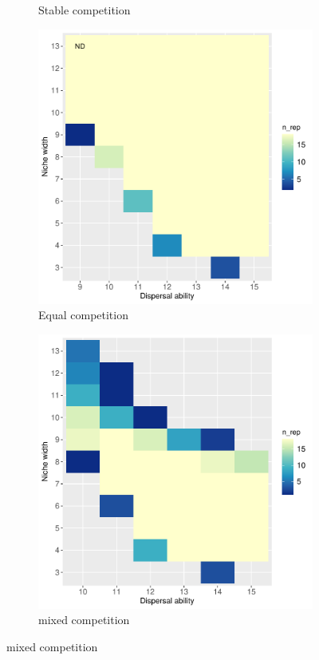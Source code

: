\begin{figure}
\begin{subfigure}[b]{0.45\linewidth}
		\caption{Stable competition}
		\label{fig:para-stable}
	\end{subfigure}
	\begin{subfigure}[b]{0.45\linewidth}
		\includegraphics[width=\linewidth]{./figures/Parameter_space_overlook_equal_competition.pdf}
		\caption{Equal competition}
		\label{fig:para-equal}
	\end{subfigure}
	\begin{subfigure}[b]{0.45\linewidth}
		\includegraphics[width=\linewidth]{./figures/Parameter_space_overlook_mixed_competition.pdf}
		\caption{mixed competition}
		\label{fig:para-mixed}
	\end{subfigure}
\end{figure}
